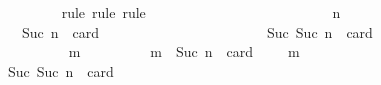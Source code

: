 \begin{isabellebody}
\ \ \ \ \ \ \ \ \ \ \ \ \isamarkupfalse%
\ {\isacharparenleft}rule{\isacharcomma}\ rule{\isacharcomma}\ rule{\isacharparenright}\isanewline
\ \ \ \ \ \ \ \ \ \ \isamarkupfalse%
\ {\isacharminus}\isanewline
\ \ \ \ \ \ \ \ \ \ \ \ \isamarkupfalse%
\ n\ {\isasymsigma}\ {\isasymsigma}{\isacharprime}\isanewline
\ \ \ \ \ \ \ \ \ \ \ \ \isamarkupfalse%
\ {\isachardoublequoteopen}{\isasymforall}{\isasymsigma}{\isasymin}{\isasymSigma}{\isachardot}\ {\isasymforall}{\isasymsigma}{\isacharprime}{\isasymin}{\isasymSigma}{\isachardot}\ {\isasymnot}\ {\isasymsigma}\ {\isasymsubseteq}\ {\isasymsigma}{\isacharprime}\ {\isasymand}\ Suc\ n\ {\isacharequal}\ card\ {\isacharparenleft}{\isasymsigma}\ {\isacharminus}\ {\isasymsigma}{\isacharprime}{\isacharparenright}\ {\isasymlongrightarrow}\ {\isasymsigma}\ {\isasymunion}\ {\isasymsigma}{\isacharprime}\ {\isasymin}\ {\isasymSigma}{\isachardoublequoteclose}\ \ {\isachardoublequoteopen}{\isasymsigma}\ {\isasymin}\ {\isasymSigma}{\isachardoublequoteclose}\ \ {\isachardoublequoteopen}{\isasymsigma}{\isacharprime}\ {\isasymin}\ {\isasymSigma}{\isachardoublequoteclose}\ \ {\isachardoublequoteopen}{\isasymnot}\ {\isasymsigma}\ {\isasymsubseteq}\ {\isasymsigma}{\isacharprime}\ {\isasymand}\ Suc\ {\isacharparenleft}Suc\ n{\isacharparenright}\ {\isacharequal}\ card\ {\isacharparenleft}{\isasymsigma}\ {\isacharminus}\ {\isasymsigma}{\isacharprime}{\isacharparenright}{\isachardoublequoteclose}\ \isanewline
\ \ \ \ \ \ \ \ \ \ \ \ \isamarkupfalse%
\ {\isachardoublequoteopen}{\isasymforall}\ m\ {\isasymin}\ {\isasymsigma}\ {\isacharminus}\ {\isasymsigma}{\isacharprime}{\isachardot}\ {\isasymnot}\ {\isasymsigma}\ {\isasymsubseteq}\ {\isasymsigma}{\isacharprime}\ {\isasymunion}\ {\isacharbraceleft}m{\isacharbraceright}\ {\isasymand}\ Suc\ n\ {\isacharequal}\ card\ {\isacharparenleft}{\isasymsigma}\ {\isacharminus}\ {\isacharparenleft}{\isasymsigma}{\isacharprime}\ {\isasymunion}\ {\isacharbraceleft}m{\isacharbraceright}{\isacharparenright}{\isacharparenright}{\isachardoublequoteclose}\isanewline
\ \ \ \ \ \ \ \ \ \ \ \ \ \ \isamarkupfalse%
\ {\isacartoucheopen}{\isasymnot}\ {\isasymsigma}\ {\isasymsubseteq}\ {\isasymsigma}{\isacharprime}\ {\isasymand}\ Suc\ {\isacharparenleft}Suc\ n{\isacharparenright}\ {\isacharequal}\ card\ {\isacharparenleft}{\isasymsigma}\ {\isacharminus}\ {\isasymsigma}{\isacharprime}{\isacharparenright}{\isacartoucheclose}\ \isanewline
\ \ \ \ \ \ \ \ \ \ \ \ \ \ \isamarkupfalse%

\end{isabellebody}
